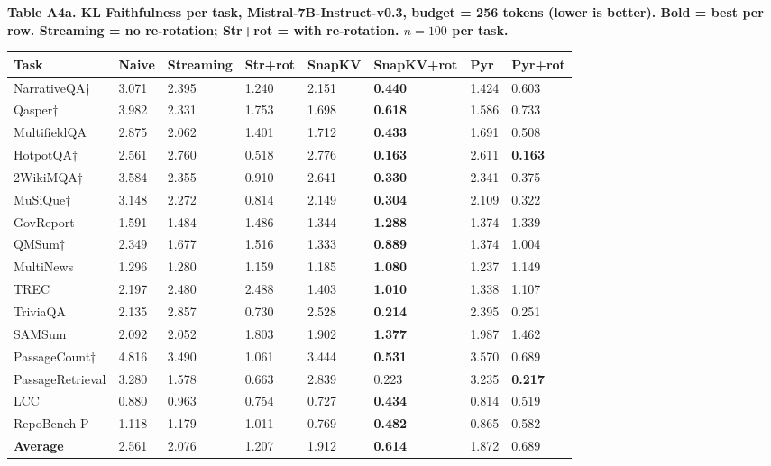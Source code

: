 \documentclass[10pt,letterpaper]{article}
\begin{document}
\textbf{Table A4a. KL Faithfulness per task, Mistral-7B-Instruct-v0.3,
budget = 256 tokens (lower is better). Bold = best per row.
Streaming = no re-rotation; Str+rot = with re-rotation.
$n = 100$ per task.}

\nopagebreak
\begin{table}[H]
\centering
\small
\begin{tabular}{@{}llllllll@{}}
\toprule
Task & Naive & Streaming & Str+rot & SnapKV & SnapKV+rot & Pyr &
Pyr+rot\\
\midrule
NarrativeQA† & 3.071 & 2.395 & 1.240 & 2.151 & \textbf{0.440} & 1.424 &
0.603\\
Qasper† & 3.982 & 2.331 & 1.753 & 1.698 & \textbf{0.618} & 1.586 &
0.733\\
MultifieldQA & 2.875 & 2.062 & 1.401 & 1.712 & \textbf{0.433} & 1.691 &
0.508\\
HotpotQA† & 2.561 & 2.760 & 0.518 & 2.776 & \textbf{0.163} & 2.611 &
\textbf{0.163}\\
2WikiMQA† & 3.584 & 2.355 & 0.910 & 2.641 & \textbf{0.330} & 2.341 &
0.375\\
MuSiQue† & 3.148 & 2.272 & 0.814 & 2.149 & \textbf{0.304} & 2.109 &
0.322\\
GovReport & 1.591 & 1.484 & 1.486 & 1.344 & \textbf{1.288} & 1.374 &
1.339\\
QMSum† & 2.349 & 1.677 & 1.516 & 1.333 & \textbf{0.889} & 1.374 &
1.004\\
MultiNews & 1.296 & 1.280 & 1.159 & 1.185 & \textbf{1.080} & 1.237 &
1.149\\
TREC & 2.197 & 2.480 & 2.488 & 1.403 & \textbf{1.010} & 1.338 &
1.107\\
TriviaQA & 2.135 & 2.857 & 0.730 & 2.528 & \textbf{0.214} & 2.395 &
0.251\\
SAMSum & 2.092 & 2.052 & 1.803 & 1.902 & \textbf{1.377} & 1.987 &
1.462\\
PassageCount† & 4.816 & 3.490 & 1.061 & 3.444 & \textbf{0.531} & 3.570 &
0.689\\
PassageRetrieval & 3.280 & 1.578 & 0.663 & 2.839 & 0.223 & 3.235 &
\textbf{0.217}\\
LCC & 0.880 & 0.963 & 0.754 & 0.727 & \textbf{0.434} & 0.814 &
0.519\\
RepoBench-P & 1.118 & 1.179 & 1.011 & 0.769 & \textbf{0.482} & 0.865 &
0.582\\
\textbf{Average} & 2.561 & 2.076 & 1.207 & 1.912 & \textbf{0.614} & 1.872 &
0.689\\
\bottomrule
\end{tabular}
\end{table}
\end{document}

